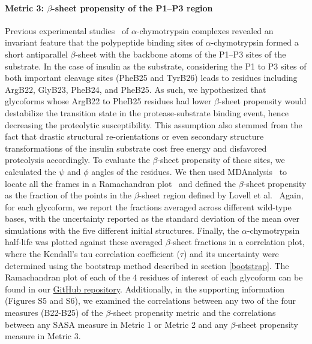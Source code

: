 \documentclass[sn-vancouver]{sn-jnl}
\begin{document}
\paragraph{Metric 3: \texorpdfstring{$\beta$}{Lg}-sheet propensity of the P1--P3 region}
Previous experimental studies~\cite{bode1993natural,hedstrom2002serine,coombs1999revisiting} of $\alpha$-chymotrypsin complexes revealed an invariant feature that the polypeptide binding sites of $\alpha$-chymotrypsin formed a short antiparallel $\beta$-sheet with the backbone atoms of the P1--P3 sites of the substrate. In the case of insulin as the substrate, considering the P1 to P3 sites of both important cleavage sites (PheB25 and TyrB26) leads to residues including ArgB22, GlyB23, PheB24, and PheB25. As such, we hypothesized that glycoforms whose ArgB22 to PheB25 residues had lower $\beta$-sheet propensity would destabilize the transition state in the protease-substrate binding event, hence decreasing the proteolytic susceptibility. This assumption also stemmed from the fact that drastic structural re-orientations or even secondary structure transformations of the insulin substrate cost free energy and disfavored proteolysis accordingly. To evaluate the $\beta$-sheet propensity of these sites, we calculated the $\psi$ and $\phi$ angles of the residues. We then used MDAnalysis~\cite{gowers2019mdanalysis, michaud2011mdanalysis} to locate all the frames in a Ramachandran plot~\cite{ramachandran1963stereochemistry} and defined the $\beta$-sheet propensity as the fraction of the points in the $\beta$-sheet region defined by Lovell et al.~\cite{lovell2003structure} Again, for each glycoform, we report the fractions averaged across different wild-type bases, with the uncertainty reported as the standard deviation of the mean over simulations with the five different initial structures. Finally, the $\alpha$-chymotrypsin half-life was plotted against these averaged $\beta$-sheet fractions in a correlation plot, where the Kendall's tau correlation coefficient ($\tau$) and its uncertainty were determined using the bootstrap method described in section \ref{bootstrap}. The Ramachandran plot of each of the 4 residues of interest of each glycoform can be found in our \href{https://github.com/shirtsgroup/Glycoinsulin_project}{GitHub repository}. Additionally, in the supporting information (Figures S5 and S6), we examined the correlations between any two of the four measures (B22-B25) of the $\beta$-sheet propensity metric and the correlations between any SASA measure in Metric 1 or Metric 2 and any $\beta$-sheet propensity measure in Metric 3. 
\end{document}
